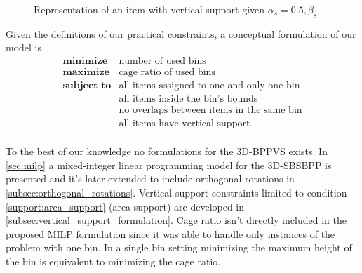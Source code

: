 \begin{figure}[H]
    \scalebox{0.55}{%
    
    }
    \caption{Representation of an item with vertical support given $\alpha_s = 0.5, \beta_s$}
    \label{fig:support}
\end{figure}

\newpage
Given the definitions of our practical constraints, a conceptual formulation of our model is
\begin{eqnarray*}
    \textbf{minimize} & \text{number of used bins} \\
    \textbf{maximize} & \text{cage ratio of used bins} \\
    \textbf{subject to} & \text{all items assigned to one and only one bin} \\
                                      & \text{all items inside the bin's bounds} \\
                                      & \text{no overlaps between items in the same bin} \\
                                      & \text{all items have vertical support} \\
\end{eqnarray*}

To the best of our knowledge no formulations for the 3D-BPPVS exists.
In \cref{sec:milp} a mixed-integer linear programming model for the 3D-SBSBPP is presented and it's later extended to include orthogonal rotations in \cref{subsec:orthogonal_rotations}.
Vertical support constraints limited to condition \ref{support:area_support} (area support) are developed in \cref{subsec:vertical_support_formulation}.
Cage ratio isn't directly included in the proposed MILP formulation since it was able to handle only instances of the problem with one bin.
In a single bin setting minimizing the maximum height of the bin is equivalent to minimizing the cage ratio.

